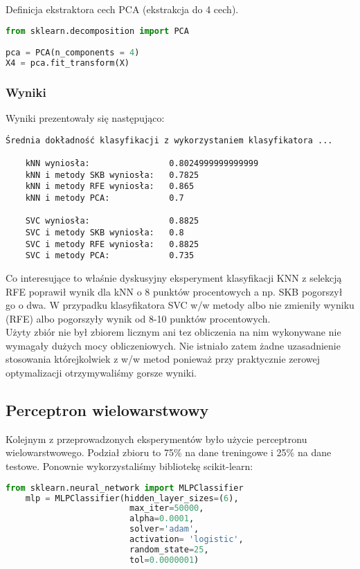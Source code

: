 Definicja ekstraktora cech PCA (ekstrakcja do 4 cech).

\begin{lstlisting}[language=Python, caption=Definicja ekstraktora cech PCA]
from sklearn.decomposition import PCA

pca = PCA(n_components = 4)
X4 = pca.fit_transform(X)
\end{lstlisting}

\subsubsection{Wyniki}
Wyniki prezentowały się następująco:

\begin{verbatim}
Średnia dokładność klasyfikacji z wykorzystaniem klasyfikatora ...

    kNN wyniosła:                0.8024999999999999
    kNN i metody SKB wyniosła:   0.7825
    kNN i metody RFE wyniosła:   0.865
    kNN i metody PCA:            0.7

    SVC wyniosła:                0.8825
    SVC i metody SKB wyniosła:   0.8
    SVC i metody RFE wyniosła:   0.8825
    SVC i metody PCA:            0.735
\end{verbatim}

Co interesujące to właśnie dyskusyjny eksperyment klasyfikacji KNN z selekcją RFE poprawił wynik dla kNN o 8 punktów procentowych a np. SKB pogorszył go o dwa. W przypadku klasyfikatora SVC w/w metody albo nie zmieniły wyniku (RFE) albo pogorszyły wynik od 8-10 punktów procentowych.\\

Użyty zbiór nie był zbiorem licznym ani tez obliczenia na nim wykonywane nie wymagały dużych mocy obliczeniowych. Nie istniało zatem żadne uzasadnienie stosowania którejkolwiek z w/w metod ponieważ przy praktycznie zerowej optymalizacji otrzymywaliśmy gorsze wyniki.\\

\subsection{Perceptron wielowarstwowy}
Kolejnym z przeprowadzonych eksperymentów było użycie perceptronu wielowarstwowego. Podział zbioru to 75\% na dane treningowe i 25\% na dane testowe. Ponownie wykorzystaliśmy bibliotekę scikit-learn:

\begin{lstlisting}[language=Python, caption=Definicja perceptronu wielowarstwowego]
    from sklearn.neural_network import MLPClassifier
    mlp = MLPClassifier(hidden_layer_sizes=(6),
                         max_iter=50000, 
                         alpha=0.0001,
                         solver='adam',
                         activation= 'logistic', 
                         random_state=25,
                         tol=0.0000001)
\end{lstlisting}

